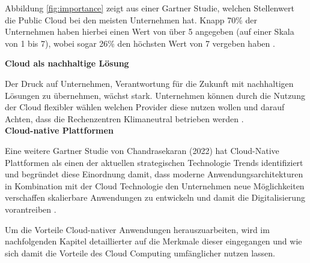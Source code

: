 Abbildung \ref{fig:importance} zeigt aus einer Gartner Studie, welchen Stellenwert die Public Cloud bei den meisten Unternehmen hat. Knapp 70\% der Unternehmen haben hierbei einen Wert von über 5 angegeben (auf einer Skala von 1 bis 7), wobei sogar 26\% den höchsten Wert von 7 vergeben haben \cite[Vgl.][S. 2]{Ganly2022}. \pagebreak

\textbf{Cloud als nachhaltige Lösung}

Der Druck auf Unternehmen, Verantwortung für die Zukunft mit nachhaltigen Lösungen zu übernehmen, wächst stark. Unternehmen können durch die Nutzung der Cloud flexibler wählen welchen Provider diese nutzen wollen und darauf Achten, dass die Rechenzentren Klimaneutral betrieben werden \cite[Vgl.][S. 24ff]{Illsley2022}. \\

\textbf{Cloud-native Plattformen}

Eine weitere Gartner Studie von Chandrasekaran (2022) hat Cloud-Native Plattformen als einen der aktuellen strategischen Technologie Trends identifiziert und begründet diese Einordnung damit, dass moderne Anwendungsarchitekturen in Kombination mit der Cloud Technologie den Unternehmen neue Möglichkeiten verschaffen skalierbare Anwendungen zu entwickeln und damit die Digitalisierung vorantreiben \cite[Vgl][S. 12]{Chandrasekaran2022}. 

Um die Vorteile Cloud-nativer Anwendungen herauszuarbeiten, wird im nachfolgenden Kapitel detaillierter auf die Merkmale dieser eingegangen und wie sich damit die Vorteile des Cloud Computing umfänglicher nutzen lassen. \pagebreak
